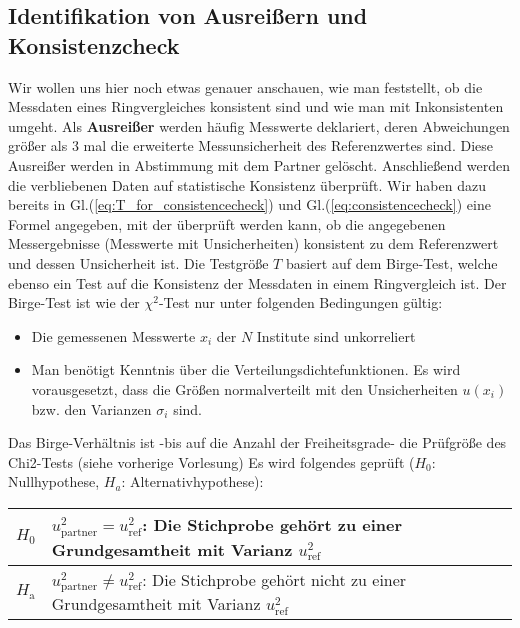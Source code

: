 \subsection{Identifikation von Ausreißern und Konsistenzcheck}
Wir wollen uns hier noch etwas genauer anschauen, wie man feststellt,
ob die Messdaten eines Ringvergleiches konsistent sind und wie man mit Inkonsistenten umgeht.
Als \textbf{Ausreißer} werden häufig Messwerte deklariert, deren Abweichungen größer
als 3 mal die erweiterte Messunsicherheit des Referenzwertes \cite{GuideKey} sind.
Diese Ausreißer werden in Abstimmung mit dem Partner gelöscht.
Anschließend werden die verbliebenen Daten auf statistische Konsistenz
überprüft. Wir haben dazu bereits in Gl.(\ref{eq:T_for_consistencecheck}) und Gl.(\ref{eq:consistencecheck})
eine Formel angegeben, mit der überprüft werden kann, ob die angegebenen
Messergebnisse (Messwerte mit Unsicherheiten) konsistent zu dem Referenzwert und
dessen Unsicherheit ist. Die Testgröße $T$ basiert auf dem Birge-Test,
welche ebenso ein Test auf die Konsistenz der Messdaten in einem Ringvergleich
ist. Der Birge-Test ist wie der $\chi^2$-Test nur unter folgenden Bedingungen
gültig:
\begin{itemize}
	\item Die gemessenen Messwerte $x_i$ der $N$ Institute sind unkorreliert
	\item Man benötigt Kenntnis über die Verteilungsdichtefunktionen. Es
	wird vorausgesetzt, dass die Größen normalverteilt mit den Unsicherheiten $u(x_i)$ bzw. den Varianzen $\sigma_i$ sind.
\end{itemize}
Das Birge-Verhältnis ist -bis auf die Anzahl der Freiheitsgrade- die Prüfgröße des Chi2-Tests (siehe vorherige Vorlesung)
Es wird folgendes geprüft ($H_0$: Nullhypothese, $H_a$: Alternativhypothese):
\begin{center}
	\begin{tabular}{l | p{14cm} }
	$H_0$	& $u_\mathrm{partner}^2 =  u_\mathrm{ref}^2$:\newline
	Die Stichprobe gehört zu
		einer Grundgesamtheit  mit Varianz $u_\mathrm{ref}^2$\\	\hline
 $H_\mathrm{a}$	& $u_\mathrm{partner}^2 \neq  u_\mathrm{ref}^2$: \newline
 Die Stichprobe gehört nicht zu einer Grundgesamtheit mit Varianz $u_\mathrm{ref}^2$\\
	\end{tabular}
\end{center}


